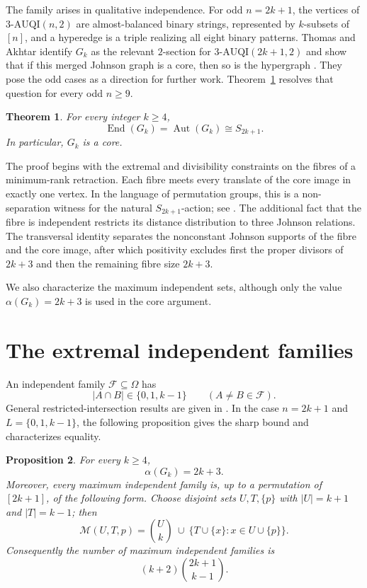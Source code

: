 \documentclass[11pt]{article}
\theoremstyle{plain}
\newtheorem{theorem}{Theorem}[section]
\newtheorem{proposition}[theorem]{Proposition}
\theoremstyle{remark}
\newcommand{\Aut}{\operatorname{Aut}}
\newcommand{\End}{\operatorname{End}}
\begin{document}
The family arises in qualitative independence.  For odd $n=2k+1$, the
vertices of $3\text{-}\mathrm{AUQI}(n,2)$ are almost-balanced binary
strings, represented by $k$-subsets of $[n]$, and a hyperedge is a triple
realizing all eight binary patterns.  Thomas and Akhtar identify $G_k$ as
the relevant $2$-section for
$3\text{-}\mathrm{AUQI}(2k+1,2)$ and show that if this merged Johnson graph
is a core, then so is the hypergraph
\cite[Lemma~7 and Proposition~7]{ThomasAkhtar2026}.  They pose the odd
cases as a direction for further work.  Theorem~\ref{thm:main} resolves
that question for every odd $n\ge9$.

\begin{theorem}\label{thm:main}
For every integer $k\ge4$,
\[
 \End(G_k)=\Aut(G_k)\cong S_{2k+1}.
\]
In particular, $G_k$ is a core.
\end{theorem}

The proof begins with the extremal and divisibility constraints on the
fibres of a minimum-rank retraction.  Each fibre meets every translate of
the core image in exactly one vertex.  In the language of permutation
groups, this is a non-separation witness for the natural
$S_{2k+1}$-action; see \cite{AljohaniBambergCameron2017}.  The additional
fact that the fibre is independent restricts its distance distribution to
three Johnson relations.  The transversal identity separates the
nonconstant Johnson supports of the fibre and the core image, after which
positivity excludes first the proper divisors of $2k+3$ and then the
remaining fibre size $2k+3$.

We also characterize the maximum independent sets, although only the value
$\alpha(G_k)=2k+3$ is used in the core argument.

\section{The extremal independent families}\label{sec:alpha}

An independent family $\mathcal F\subseteq \Omega$ has
\begin{equation}\label{eq:allowed-intersections}
 |A\cap B|\in\{0,1,k-1\}\qquad(A\ne B\in\mathcal F).
\end{equation}
General restricted-intersection results are given in
\cite{DezaErdosFrankl1978}.  In the case $n=2k+1$ and
$L=\{0,1,k-1\}$, the following proposition gives the sharp bound and
characterizes equality.

\begin{proposition}\label{prop:alpha}
For every $k\ge4$,
\[
 \alpha(G_k)=2k+3.
\]
Moreover, every maximum independent family is, up to a permutation of
$[2k+1]$, of the following form.  Choose disjoint sets $U,T,\{p\}$ with
$|U|=k+1$ and $|T|=k-1$; then
\begin{equation}\label{eq:max-independent}
 \mathcal M(U,T,p)=
 \binom Uk\ \cup\ \{T\cup\{x\}:x\in U\cup\{p\}\}.
\end{equation}
Consequently the number of maximum independent families is
\[
 (k+2)\binom{2k+1}{k-1}.
\]
\end{proposition}
\end{document}
